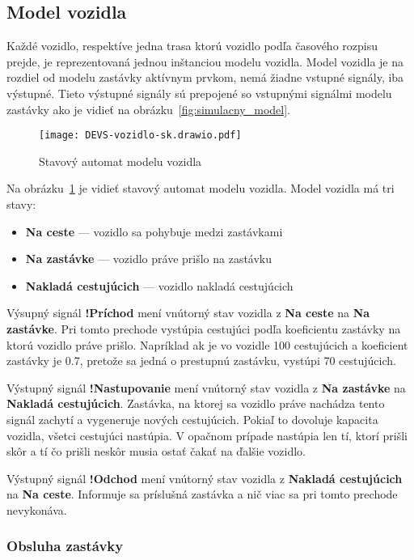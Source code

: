 \subsection*{Model vozidla}\label{model_vozidla}

Každé vozidlo, respektíve jedna trasa ktorú vozidlo podľa časového rozpisu prejde, je reprezentovaná jednou inštanciou modelu vozidla.
Model vozidla je na rozdiel od modelu zastávky aktívnym prvkom, nemá žiadne vstupné signály, iba výstupné.
Tieto výstupné signály sú prepojené so vstupnými signálmi modelu zastávky ako je vidieť na obrázku~\ref{fig:simulacny_model}.

\begin{figure}[h]\label{fig:model_vozidla}
  \centering
  \texttt{[image: DEVS-vozidlo-sk.drawio.pdf]}
  \caption{Stavový automat modelu vozidla}
\end{figure}

Na obrázku~\ref{fig:model_vozidla} je vidieť stavový automat modelu vozidla.
Model vozidla má tri stavy:
\begin{itemize}
  \item \textbf{Na ceste} --- vozidlo sa pohybuje medzi zastávkami
  \item \textbf{Na zastávke} --- vozidlo práve prišlo na zastávku
  \item \textbf{Nakladá cestujúcich} --- vozidlo nakladá cestujúcich
\end{itemize}

Výsupný signál \textbf{!Príchod} mení vnútorný stav vozidla z \textbf{Na ceste} na \textbf{Na zastávke}.
Pri tomto prechode vystúpia cestujúci podľa koeficientu zastávky na ktorú vozidlo práve prišlo.
Napríklad ak je vo vozidle 100 cestujúcich a koeficient zastávky je 0.7, pretože sa jedná o prestupnú zastávku, vystúpi 70 cestujúcich.

Výstupný signál \textbf{!Nastupovanie} mení vnútorný stav vozidla z \textbf{Na zastávke} na \textbf{Nakladá cestujúcich}.
Zastávka, na ktorej sa vozidlo práve nachádza tento signál zachytí a vygeneruje nových cestujúcich.
Pokiaľ to dovoluje kapacita vozidla, všetci cestujúci nastúpia.
V opačnom prípade nastúpia len tí, ktorí prišli skôr a tí čo prišli neskôr musia ostať čakať na ďalšie vozidlo.

Výstupný signál \textbf{!Odchod} mení vnútorný stav vozidla z \textbf{Nakladá cestujúcich} na \textbf{Na ceste}.
Informuje sa príslušná zastávka a nič viac sa pri tomto prechode nevykonáva.

\subsubsection{Obsluha zastávky}

